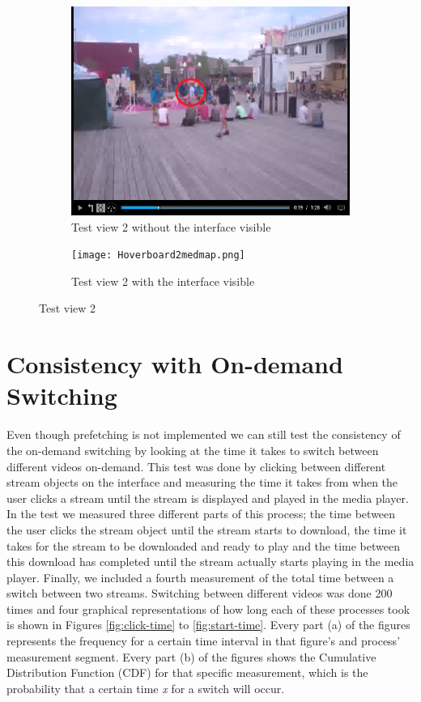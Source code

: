 \begin{figure}
\begin{subfigure}[b]{0.5\textwidth}
 	\includegraphics[width=\linewidth]{Hoverboard_2.png}
  	\caption{Test view 2 without the interface visible}\label{fig:testview2A}
    \end{subfigure}\hfill 
    \hspace{3px}
    \begin{subfigure}[b]{0.5\textwidth}
	 \texttt{[image: Hoverboard2medmap.png]}
 	\caption{Test view 2 with the interface visible}\label{fig:testview2B}
    \end{subfigure}
	\caption{Test view 2}
	\label{fig:testview2}
\end{figure}

\section{Consistency with On-demand Switching}
Even though prefetching is not implemented we can still test the consistency of the on-demand switching by looking at the time it takes to switch between different videos on-demand. This test was done by clicking between different stream objects on the interface and measuring the time it takes from when the user clicks a stream until the stream is displayed and played in the media player. In the test we measured three different parts of this process; the time between the user clicks the stream object until the stream starts to download, the time it takes for the stream to be downloaded and ready to play and the time between this download has completed until the stream actually starts playing in the media player. Finally, we included a fourth measurement of the total time between a switch between two streams. Switching between different videos was done 200 times and four graphical representations of how long each of these processes took is shown in Figures \ref{fig:click-time} to \ref{fig:start-time}. Every part (a) of the figures represents the frequency for a certain time interval in that figure's and process’ measurement segment. Every part (b) of the figures shows the Cumulative Distribution Function (CDF) for that specific measurement, which is the probability that a certain time \textit{x} for a switch will occur.

